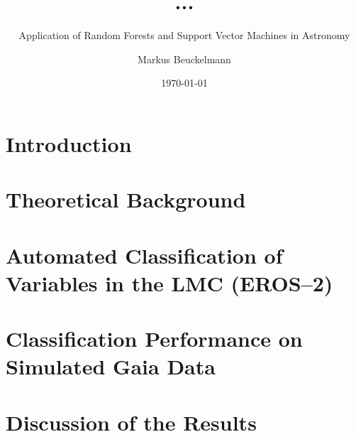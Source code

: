 

\title{...}
\subtitle{Application of Random Forests and Support Vector Machines in Astronomy}

\author{Markus Beuckelmann}
\date{\today}






\label{sec:abstract}

\tableofcontents

\newpage

\chapter{Introduction}
\label{sec:introduction}


\chapter{Theoretical Background}
\label{sec:theory}


\chapter{Automated Classification of Variables in the LMC (EROS--2)}
\label{sec:main}


\chapter{Classification Performance on Simulated Gaia Data}
\label{sec:main-gaia}


\chapter{Discussion of the Results}
\label{sec:discussion}


\cleardoublepage
{}
\listoffigures

\cleardoublepage
{}




\clearpage
{}

\label{sec:declaration}



